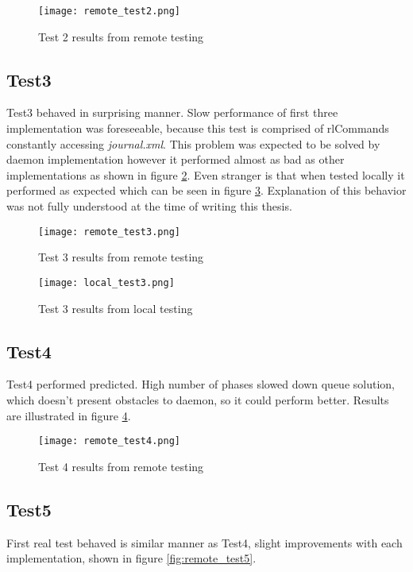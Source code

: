 \begin{figure}
  \texttt{[image: remote\_test2.png]}
  \caption{Test 2 results from remote testing}
  \label{fig:remote_test2}
\end{figure}

\subsection{Test3}
Test3 behaved in surprising manner. Slow performance of first three implementation was foreseeable, because this test is comprised of rlCommands constantly accessing \textit{journal.xml}. This problem was expected to be solved by daemon implementation however it performed almost as bad as other implementations as shown in figure \ref{fig:remote_test3}. Even stranger is that when tested locally it performed as expected which can be seen in figure \ref{fig:local_test3}. Explanation of this behavior was not fully understood at the time of writing this thesis. 

\begin{figure}
  \texttt{[image: remote\_test3.png]}
  \caption{Test 3 results from remote testing}
  \label{fig:remote_test3}
\end{figure}

\begin{figure}
  \texttt{[image: local\_test3.png]}
  \caption{Test 3 results from local testing}
  \label{fig:local_test3}
\end{figure}

\subsection{Test4}
Test4 performed predicted. High number of phases slowed down queue solution, which doesn't present obstacles to daemon, so it could perform better. Results are illustrated in figure \ref{fig:remote_test4}.

\begin{figure}
  \texttt{[image: remote\_test4.png]}
  \caption{Test 4 results from remote testing}
  \label{fig:remote_test4}
\end{figure}

\subsection{Test5}
First real test behaved is similar manner as Test4, slight improvements with each implementation, shown in figure \ref{fig:remote_test5}.

